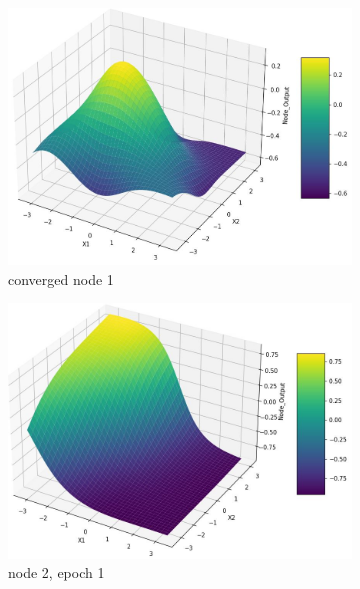 \documentclass[11pt]{article}
\begin{document}
\begin{figure}[h!]
\begin{subfigure}[b]{0.45\textwidth}
	\includegraphics[scale=0.14]{hidden2_n1_c.jpg}
	\caption{converged node 1}
	\label{fig:fig2.1.6.5}
	\end{subfigure}
	\begin{subfigure}[b]{0.3\textwidth}
	\centering
	\includegraphics[scale=0.14]{hidden2_n2_e1.jpg}
	\caption{node 2, epoch 1}
	\label{fig:fig2.1.6.6}
	\end{subfigure}
	\begin{subfigure}[b]{0.3\textwidth}
	\centering

\end{subfigure}
\end{figure}
\end{document}
